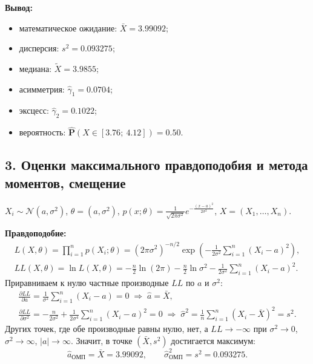 \documentclass[12pt]{spbstu-task}
\renewcommand{\Prob}{\mathbf{P}}
\begin{document}
\noindent\textbf{Вывод:}
\begin{itemize}[label=\textbullet]
  \item математическое ожидание: \(\bar{X} = 3.99092\);
  \item дисперсия: \(s^2 = 0.093275\);
  \item медиана: \(\tilde{X} = 3.9855\);
  \item асимметрия: \(\hat{\gamma}_1 = 0.0704\);
  \item эксцесс: \(\hat{\gamma}_2 = 0.1022\);
  \item вероятность: \(\hat{\Prob}\left(X \in [3.76;\ 4.12]\right) = 0.50\).
\end{itemize}

\subsection*{3. Оценки максимального правдоподобия и метода моментов, смещение}
\(X_i \sim \mathcal{N}(a, \sigma^2)\), \(\theta = (a, \sigma^2)\),
\(p(x; \theta) = \frac{1}{\sqrt{2\pi\sigma^2}}e^{-\frac{(x - a)^2}{2\sigma^2}}\), \(X = (X_1, \ldots, X_n)\).

\textbf{Правдоподобие:}
\begin{gather*}
  L(X, \theta) = \prod_{i=1}^{n}p(X_i; \theta)
  = \left(2\pi\sigma^2\right)^{-n/2}\exp\left(-\frac{1}{2\sigma^2}\sum_{i=1}^{n}(X_i - a)^2\right),\\
  LL(X, \theta) = \ln L(X, \theta)
  = -\frac{n}{2}\ln(2\pi) - \frac{n}{2}\ln\sigma^2 - \frac{1}{2\sigma^2}\sum_{i=1}^{n}(X_i - a)^2.
\end{gather*}
Приравниваем к нулю частные производные \(LL\) по \(a\) и \(\sigma^2\):
\begin{gather*}
  \frac{\partial LL}{\partial a} = \frac{1}{\sigma^2}\sum_{i=1}^{n}(X_i - a) = 0
  \;\Rightarrow\; \hat{a} = \bar{X},\\
  \frac{\partial LL}{\partial\sigma^2} = -\frac{n}{2\sigma^2} + \frac{1}{2\sigma^4}\sum_{i=1}^{n}(X_i - a)^2 = 0
  \;\Rightarrow\; \hat{\sigma}^2 = \frac{1}{n}\sum_{i=1}^{n}\left(X_i - \bar{X}\right)^2 = s^2.
\end{gather*}
Других точек, где обе производные равны нулю, нет, а \(LL \to -\infty\) при \(\sigma^2 \to 0\),
\(\sigma^2 \to \infty\), \(|a| \to \infty\). Значит, в точке \((\bar{X}, s^2)\) достигается максимум:
\begin{displaymath}
  \hat{a}_{\text{ОМП}} = \bar{X} = 3.99092,\qquad \hat{\sigma}^2_{\text{ОМП}} = s^2 = 0.093275.
\end{displaymath}
\end{document}

